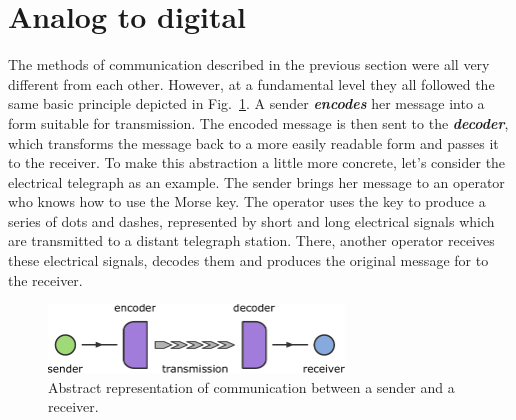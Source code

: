 
\section{Analog to digital}


The methods of communication described in the previous section were all very different from each other.
However, at a fundamental level they all followed the same basic principle depicted in Fig.~\ref{fig:1-2_communication}.
A sender \textit{\textbf{encodes}} her message into a form suitable for transmission.
The encoded message is then sent to the \textit{\textbf{decoder}}, which transforms the message back to a more easily readable form and passes it to the receiver.
To make this abstraction a little more concrete, let's consider the electrical telegraph as an example.
The sender brings her message to an operator who knows how to use the Morse key.
The operator uses the key to produce a series of dots and dashes, represented by short and long electrical signals which are transmitted to a distant telegraph station.
There, another operator receives these electrical signals, decodes them and produces the original message for to the receiver.

\begin{figure}[t]
    \centering
    \includegraphics[width=0.7\textwidth]{lesson1/1-2_communication.pdf}
    \caption[Abstraction of communication]{Abstract representation of communication between a sender and a receiver.}
    \label{fig:1-2_communication}
\end{figure}

